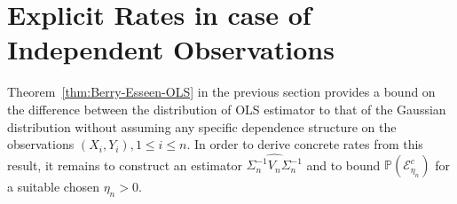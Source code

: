 \documentclass[11pt]{article}
\begin{document}



\section{Explicit Rates in case of Independent Observations}
\label{section::explicit}


Theorem~\ref{thm:Berry-Esseen-OLS} in the previous section provides a bound on the difference between the distribution of OLS estimator to that of the Gaussian distribution without assuming any specific dependence structure on the observations $(X_i, Y_i), 1 \le i\le n$. In order to derive concrete rates from this result, it remains to construct an estimator $\widehat{\Sigma_n^{-1}V_n\Sigma_n^{-1}}$ and to bound $\mathbb{P}(\mathcal{E}_{\eta_n}^c)$ for a suitable chosen $\eta_n > 0$. 
\end{document}
